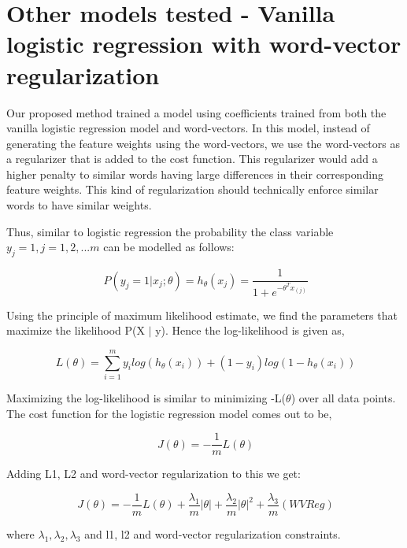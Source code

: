 
\section{Other models tested - Vanilla logistic regression with word-vector regularization}

Our proposed method trained a model using coefficients trained from both the vanilla logistic regression model and word-vectors. In this model, instead of generating the feature weights using the word-vectors, we use the word-vectors as a regularizer that is added to the cost function. This regularizer would add a higher penalty to similar words having large differences in their corresponding feature weights. This kind of regularization should technically enforce similar words to have similar weights.

Thus, similar to logistic regression the probability the class variable $y_{j}=1, j=1,2,...m$ can be modelled as follows:

\begin{equation}
\ P(y_{j}  = 1 | x_{j}; \theta) = h_{\theta}(x_{j}) = \frac{1}{1+e^{-\theta^{T}x_{(j)}}}
\end{equation}

Using the principle of maximum likelihood estimate, we find the parameters that maximize the likelihood P(X $|$ y). Hence the log-likelihood is given as,

\begin{equation}
\ L(\theta) = \sum_{i=1}^{m}{y_{i}log(h_{\theta}(x_{i})) + (1-y_{i})log(1-h_{\theta}(x_{i}))}
\end{equation}

Maximizing the log-likelihood is similar to minimizing -L($\theta$) over all data points. The cost function for the logistic regression model comes out to be,

\begin{equation}
\ J(\theta) = -\frac{1}{m}{L(\theta)}
\end{equation}

Adding L1, L2 and word-vector regularization to this we get:

\begin{equation}
\ J(\theta) = -\frac{1}{m}{L(\theta)} + \frac{\lambda_{1}}{m}{|{\theta}|} + \frac{\lambda_{2}}{m}{|{\theta}|}^{2} + 
\frac{\lambda_{3}}{m}{(WV Reg)}
\end{equation}

where $\lambda_{1}, \lambda_{2}, \lambda_{3}$ and l1, l2 and word-vector regularization constraints.\\


